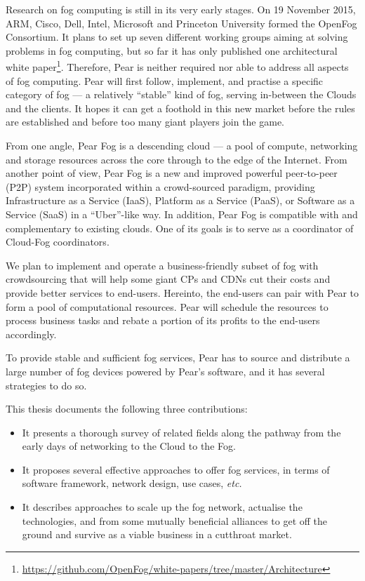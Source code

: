 Research on fog computing is still in its very early stages. On 19 November 2015, ARM, Cisco, Dell, Intel, Microsoft and Princeton University formed the OpenFog Consortium. It plans to set up seven different working groups aiming at solving problems in fog computing, but so far it has only published one architectural white paper\footnote{\url{https://github.com/OpenFog/white-papers/tree/master/Architecture}}. Therefore, Pear is neither required nor able to address all aspects of fog computing. Pear will first follow, implement, and practise a specific category of fog --- a relatively ``stable'' kind of fog, serving in-between the Clouds and the clients. It hopes it can get a foothold in this new market before the rules are established and before too many giant players join the game.

From one angle, Pear Fog is a descending cloud --- a pool of compute, networking and storage resources across the core through to the edge of the Internet. From another point of view, Pear Fog is a new and improved powerful peer-to-peer (P2P) system incorporated within a crowd-sourced paradigm, providing Infrastructure as a Service (IaaS), Platform as a Service (PaaS), or Software as a Service (SaaS) in a ``Uber''-like way. 
In addition, Pear Fog is compatible with and complementary to existing clouds. One of its goals is to serve as a coordinator of Cloud-Fog coordinators. 

We plan to implement and operate a business-friendly subset of fog with crowdsourcing that will help some giant CPs and CDNs cut their costs and provide better services to end-users. Hereinto, the end-users can pair with Pear to form a pool of computational resources. 
Pear will schedule the resources to process business tasks and rebate a portion of its profits to the end-users accordingly. 

To provide stable and sufficient fog services, Pear has to source and distribute a large number of fog devices powered by Pear's software, and it has several strategies to do so. %

This thesis documents the following three contributions:
\begin{itemize}
	\item It presents a thorough survey of related fields along the pathway from the early days of networking to the Cloud to the Fog. 
	\item It proposes several effective approaches to offer fog services, in terms of software framework, network design, use cases, {\em etc.}
	\item It describes approaches to scale up the fog network, actualise the technologies, and from some mutually beneficial alliances to get off the ground and survive as a viable business in a cutthroat market. 
\end{itemize} 

